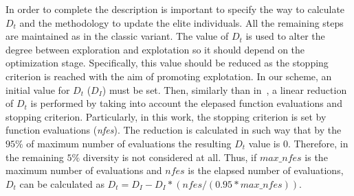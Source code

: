 In order to complete the description is important to specify the way to calculate $D_t$ and the methodology to update the 
elite individuals.
%
All the remaining steps are maintained as in the classic \DE{} variant.
%
The value of $D_t$ is used to alter the degree between exploration and explotation so it should depend on the optimization stage.
%
Specifically, this value should be reduced as the stopping criterion is reached with the aim of promoting explotation.
%
In our scheme, an initial value for $D_t$ ($D_I$) must be set.
%
Then, similarly than in~\cite{segura2016novel}, a linear reduction of $D_t$ is performed by taking into account the elepased function evaluations and stopping criterion.
%
Particularly, in this work, the stopping criterion is set by function evaluations (\textit{nfes}).
%
The reduction is calculated in such way that by the $95\%$ of maximum number of evaluations the resulting $D_t$ value is $0$.
%
Therefore, in the remaining $5\%$ diversity is not considered at all.
%
Thus, if $max\_nfes$ is the maximum number of evaluations and $nfes$ is the elapsed number of evaluations, $D_t$ can be calculated as $D_t=D_I - D_I *(nfes/(0.95*max\_nfes))$.
%
%

%


